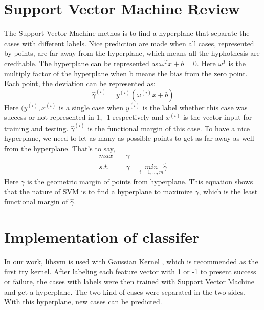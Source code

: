 \section{Support Vector Machine Review}
The Support Vector Machine methos is to find a hyperplane that separate the cases with different labels. Nice prediction are made when all cases, represented by points, are far away from the hyperplane, which means all the hyphothesis are creditable. The hyperplane can be represented as:$\omega^{T}x+b=0$. Here $\omega^{T}$ is the multiply factor of the hyperplane when b means the bias from the zero point. Each point, the deviation can be represented as: \\
\begin{equation}
    \hat{\gamma}^{(i)}=y^{(i)}(\omega^{(i)}x+b)
\end{equation}
Here $(y^{(i)}, x^{(i)}$ is a single case when $y^{(i)}$ is the label whether this case was success or not represented in {1, -1} respectively and $x^{(i)}$ is the vector input for training and testing. $\hat{\gamma}^{(i)}$ is the functional margin of this case. To have a nice hyperplane, we need to let as many as possible points to get as far away as well from the hyperplane. That's to say,
\begin{equation}
    \begin{split}
        max\quad&\gamma \nonumber \\
        s.t.\quad&\gamma = \underset{i = 1,\ldots,m}{min}\hat{\gamma}
    \end{split}
\end{equation}
Here $\gamma$ is the geometric margin of points from hyperplane. This equation shows that the nature of SVM is to find a hyperplane to maximize $\gamma$, which is the least functional margin of $\hat{\gamma}$.
\section{Implementation of classifer}
\indent In our work, libsvm \cite{CC01a} is used with Gaussian Kernel \cite{keerthi2003asymptotic}, which is recommended as the first try kernel. After labeling each feature vector with 1 or -1 to present success or failure, the cases with labels were then trained with Support Vector Machine and get a hyperplane. The two kind of cases were separated in the two sides. With this hyperplane, new cases can be predicted. \\
